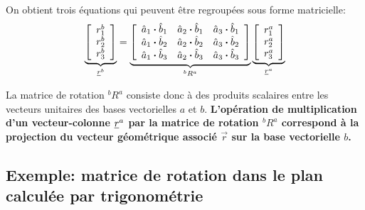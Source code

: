 On obtient trois équations qui peuvent être regroupées sous forme matricielle:
\begin{align}
\underbrace{ \left[ \begin{array}{c} r_1^b \\ r_2^b \\ r_3^b  \end{array} \right] }_{\underline{r}^b}
=
\underbrace{ \left[ \begin{array}{c c c} 
\hat{a}_1 \boldsymbol{\cdot} \hat{b}_1 & \hat{a}_2 \boldsymbol{\cdot} \hat{b}_1 & \hat{a}_3 \boldsymbol{\cdot} \hat{b}_1 \\
\hat{a}_1 \boldsymbol{\cdot} \hat{b}_2 & \hat{a}_2 \boldsymbol{\cdot} \hat{b}_2 & \hat{a}_3 \boldsymbol{\cdot} \hat{b}_2 \\
\hat{a}_1 \boldsymbol{\cdot} \hat{b}_3 & \hat{a}_2 \boldsymbol{\cdot} \hat{b}_3 & \hat{a}_3 \boldsymbol{\cdot} \hat{b}_3 
\end{array} \right] }_{^bR^a}
\underbrace{ \left[ \begin{array}{c} r_1^a \\ r_2^a \\ r_3^a  \end{array} \right] }_{\underline{r}^a}
\label{eq:Rdot}
\end{align} 

La matrice de rotation $^bR^a$ consiste donc à des produits scalaires entre les vecteurs unitaires des bases vectorielles $a$ et $b$. \textbf{L'opération de multiplication d'un vecteur-colonne $\underline{r}^a$ par la matrice de rotation $^bR^a$ correspond à la projection du vecteur géométrique associé $\vec{r}$ sur la base vectorielle $b$.}



\subsection{Exemple: matrice de rotation dans le plan calculée par trigonométrie}

